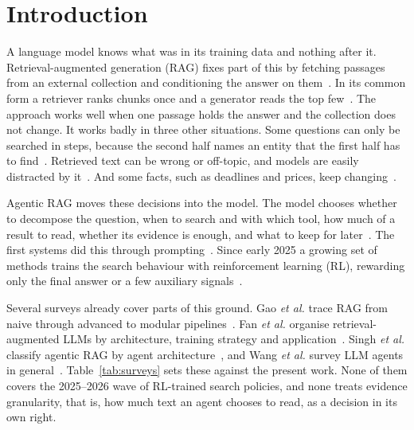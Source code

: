 \documentclass[pdflatex,sn-mathphys-num]{sn-jnl}%
\begin{document}
\section{Introduction}
\label{sec:intro}

A language model knows what was in its training data and nothing after it. Retrieval-augmented generation (RAG) fixes part of this by fetching passages from an external collection and conditioning the answer on them~\cite{lewis2020rag,guu2020realm}. In its common form a retriever ranks chunks once and a generator reads the top few~\cite{gao2023ragsurvey,fan2024ragsurvey}. The approach works well when one passage holds the answer and the collection does not change. It works badly in three other situations. Some questions can only be searched in steps, because the second half names an entity that the first half has to find~\cite{trivedi2023ircot,press2023selfask}. Retrieved text can be wrong or off-topic, and models are easily distracted by it~\cite{shi2023distracted,liu2024lost}. And some facts, such as deadlines and prices, keep changing~\cite{vu2024freshllms}.

Agentic RAG moves these decisions into the model. The model chooses whether to decompose the question, when to search and with which tool, how much of a result to read, whether its evidence is enough, and what to keep for later~\cite{singh2025agenticrag}. The first systems did this through prompting~\cite{yao2023react,trivedi2023ircot,jiang2023flare}. Since early 2025 a growing set of methods trains the search behaviour with reinforcement learning (RL), rewarding only the final answer or a few auxiliary signals~\cite{jin2025searchr1,song2025r1searcher,chen2025research,zheng2025deepresearcher}.

Several surveys already cover parts of this ground. Gao \textit{et al.} trace RAG from naive through advanced to modular pipelines~\cite{gao2023ragsurvey}. Fan \textit{et al.} organise retrieval-augmented LLMs by architecture, training strategy and application~\cite{fan2024ragsurvey}. Singh \textit{et al.} classify agentic RAG by agent architecture~\cite{singh2025agenticrag}, and Wang \textit{et al.} survey LLM agents in general~\cite{wang2024agentsurvey}. Table~\ref{tab:surveys} sets these against the present work. None of them covers the 2025--2026 wave of RL-trained search policies, and none treats evidence granularity, that is, how much text an agent chooses to read, as a decision in its own right.
\end{document}
